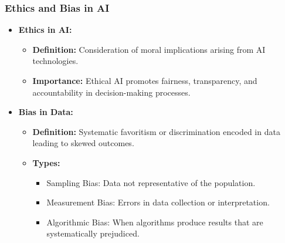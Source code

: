\documentclass[aspectratio=169]{beamer}
\begin{document}
\begin{frame}[fragile]
    \frametitle{Ethics and Bias in AI}
    \begin{itemize}
        \item \textbf{Ethics in AI:}
        \begin{itemize}
            \item \textbf{Definition:} Consideration of moral implications arising from AI technologies.
            \item \textbf{Importance:} Ethical AI promotes fairness, transparency, and accountability in decision-making processes.
        \end{itemize}

        \item \textbf{Bias in Data:}
        \begin{itemize}
            \item \textbf{Definition:} Systematic favoritism or discrimination encoded in data leading to skewed outcomes.
            \item \textbf{Types:}
            \begin{itemize}
                \item Sampling Bias: Data not representative of the population.
                \item Measurement Bias: Errors in data collection or interpretation.
                \item Algorithmic Bias: When algorithms produce results that are systematically prejudiced.
            \end{itemize}
        \end{itemize}
    \end{itemize}
\end{frame}
\end{document}
